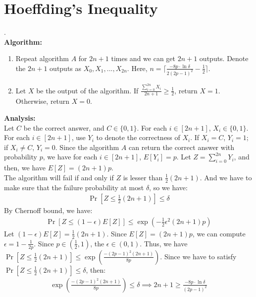 \section{Hoeffding's Inequality}
.  \\
\textbf{Algorithm:}\\
\begin{enumerate}
    \item  Repeat algorithm $A$ for $2n+1$ times and we can get $2n+1$ outputs.
    Denote the $2n+1$ outputs as $X_0,X_1,...,X_{2n}$. Here, $n=\lceil \frac{-8p\cdot \ln \delta }{2(2p-1)^2} -\frac{1}{2}\rceil $.
    \item Let $X$ be the output of the algorithm. 
    If $\frac{\sum_{i=0}^{2n}X_i}{2n+1}\ge \frac{1}{2}$, return $X=1$. Otherwise, return $X=0$.
\end{enumerate}
\textbf{Analysis:}\\
Let $C$ be the correct answer, and $C\in\{0,1\}$.
For each $i\in [2n+1]$, $X_i\in \{0, 1\}$. 
For each $i\in [2n+1]$, use $Y_i$ to denote the correctness of $X_i$.
If $X_i=C$, $Y_i=1$; if $X_i\neq C$, $Y_i=0$. 
Since the algorithm $A$ can return the correct answer with probability $p$, 
we have for each $i \in [2n+1]$, $E[Y_i]=p$.
Let $Z=\sum_{i=0}^{2n}Y_i$, and then, we have $E[Z]=(2n+1)p$.\\
The algorithm will fail if and only if $Z$ is lesser than $\frac{1}{2}(2n+1)$. 
And we have to make sure that the failure probability at most $\delta$, so we have:
\begin{align}
    \nonumber  \Pr[Z\le\frac{1}{2}(2n+1)]\le \delta
\end{align}
By Chernoff bound, we have:
\begin{align}
    \nonumber \Pr[Z \le (1-\epsilon) E[Z]]\le \exp({-\frac{1}{2}\epsilon^2(2n+1)p})
\end{align}
Let $(1-\epsilon) E[Z]= \frac{1}{2}(2n+1)$. Since $E[Z]=(2n+1)p$, we can compute $\epsilon=1-\frac{1}{2p}$.
Since $p\in (\frac{1}{2},1)$, the $\epsilon \in (0,1) $.
Thus, we have $\Pr[Z \le \frac{1}{2}(2n+1)]\le \exp({\frac{-(2p-1)^2(2n+1)}{8p}})$.
Since we have to satisfy $\Pr[Z\le\frac{1}{2}(2n+1)]\le \delta$, then:
\begin{align}
    \nonumber \exp({\frac{-(2p-1)^2(2n+1)}{8p}}) \le \delta \implies 2n+1 \ge \frac{-8p\cdot \ln \delta }{(2p-1)^2}
\end{align}
